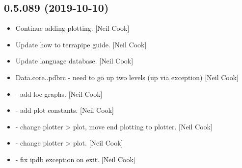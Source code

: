 \documentclass[a4paper,10pt,english]{report}
\begin{document}
\subsection{0.5.089 (2019-10-10)}
\label{\detokenize{misc/changelog:id54}}\begin{itemize}
\item {} 
Continue adding plotting. {[}Neil Cook{]}

\item {} 
Update how to terrapipe guide. {[}Neil Cook{]}

\item {} 
Update language database. {[}Neil Cook{]}

\item {} 
Data.core..pdbrc - need to go up two levels (up via exception) {[}Neil
Cook{]}

\item {} 
 - add loc graphs. {[}Neil
Cook{]}

\item {} 
 - add plot constants. {[}Neil
Cook{]}

\item {} 
 - change plotter \textendash{}\textgreater{} plot, move end plotting
to plotter. {[}Neil Cook{]}

\item {} 
 - change plotter \textendash{}\textgreater{} plot. {[}Neil Cook{]}

\item {} 
 - fix ipdb exception on exit. {[}Neil
Cook{]}

\end{itemize}
\end{document}
